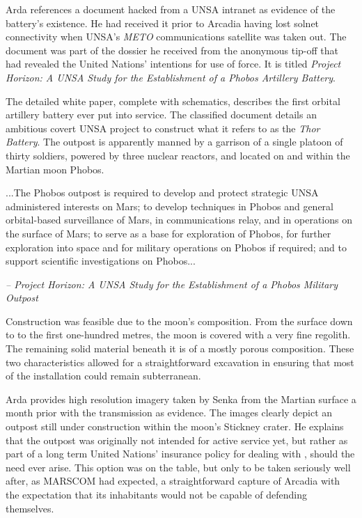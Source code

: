 Arda references a document hacked from a UNSA intranet as evidence of the battery's existence. He had received it prior to Arcadia having lost solnet connectivity when UNSA's {\it METO} communications satellite was taken out. The document was part of the dossier he received from the anonymous tip-off that had revealed the United Nations' intentions for use of force. It is titled {\it Project Horizon: A UNSA Study for the Establishment of a Phobos Artillery Battery}.

The detailed white paper, complete with schematics, describes the first orbital artillery battery ever put into service. The classified document details an ambitious covert UNSA project to construct what it refers to as the {\it Thor Battery}. The outpost is apparently manned by a garrison of a single platoon of thirty soldiers, powered by three nuclear reactors, and located on and within the Martian moon Phobos. 

\startTimelineGeneralDocument
...The Phobos outpost is required to develop and protect strategic UNSA administered interests on Mars; to develop techniques in Phobos and general orbital-based surveillance of Mars, in communications relay, and in operations on the surface of Mars; to serve as a base for exploration of Phobos, for further exploration into space and for military operations on Phobos if required; and to support scientific investigations on Phobos...

\hskip 1.5cm {\it -- Project Horizon: A UNSA Study for the Establishment of a Phobos Military Outpost}
\stopTimelineGeneralDocument

Construction was feasible due to the moon's composition. From the surface down to to the first one-hundred metres, the moon is covered with a very fine regolith. The remaining solid material beneath it is of a mostly porous composition. These two characteristics allowed for a straightforward excavation in ensuring that most of the installation could remain subterranean.

Arda provides high resolution imagery taken by Senka from the Martian surface a month prior with the transmission as evidence. The images clearly depict an outpost still under construction within the moon's Stickney crater. He explains that the outpost was originally not intended for active service yet, but rather as part of a long term United Nations' insurance policy for dealing with , should the need ever arise. This option was on the table, but only to be taken seriously well after, as MARSCOM had expected, a straightforward capture of Arcadia with the expectation that its inhabitants would not be capable of defending themselves.

